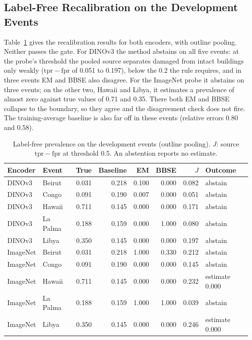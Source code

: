 \documentclass[journal]{IEEEtran}
\begin{document}
\subsection{Label-Free Recalibration on the Development Events}
\label{sec:res-c3}
Table~\ref{tab:c3} gives the recalibration results for both encoders, with outline pooling. Neither passes the gate. For DINOv3 the method abstains on all five events: at the probe's threshold the pooled source separates damaged from intact buildings only weakly ($\mathrm{tpr}-\mathrm{fpr}$ of 0.051 to 0.197), below the 0.2 the rule requires, and in three events EM and BBSE also disagree. For the ImageNet probe it abstains on three events; on the other two, Hawaii and Libya, it estimates a prevalence of almost zero against true values of 0.71 and 0.35. There both EM and BBSE collapse to the boundary, so they agree and the disagreement check does not fire. The training-average baseline is also far off in these events (relative errors 0.80 and 0.58).

\begin{table}[t]
\centering
\caption{Label-free prevalence on the development events (outline pooling). $J$: source $\mathrm{tpr}-\mathrm{fpr}$ at threshold 0.5. An abstention reports no estimate.}
\label{tab:c3}
\footnotesize
\setlength{\tabcolsep}{2.5pt}
\begin{tabular}{@{}llrrrrrl@{}}
\toprule
Encoder & Event & True & Baseline & EM & BBSE & $J$ & Outcome \\
\midrule
DINOv3 & Beirut & 0.031 & 0.218 & 0.100 & 0.000 & 0.082 & abstain \\
DINOv3 & Congo & 0.091 & 0.190 & 0.007 & 0.000 & 0.051 & abstain \\
DINOv3 & Hawaii & 0.711 & 0.145 & 0.000 & 0.000 & 0.171 & abstain \\
DINOv3 & La Palma & 0.188 & 0.159 & 0.000 & 1.000 & 0.080 & abstain \\
DINOv3 & Libya & 0.350 & 0.145 & 0.000 & 0.000 & 0.197 & abstain \\
\midrule
ImageNet & Beirut & 0.031 & 0.218 & 1.000 & 0.330 & 0.212 & abstain \\
ImageNet & Congo & 0.091 & 0.190 & 0.000 & 0.000 & 0.145 & abstain \\
ImageNet & Hawaii & 0.711 & 0.145 & 0.000 & 0.000 & 0.232 & estimate 0.000 \\
ImageNet & La Palma & 0.188 & 0.159 & 1.000 & 1.000 & 0.039 & abstain \\
ImageNet & Libya & 0.350 & 0.145 & 0.000 & 0.000 & 0.246 & estimate 0.000 \\
\bottomrule
\end{tabular}
\end{table}
\end{document}
